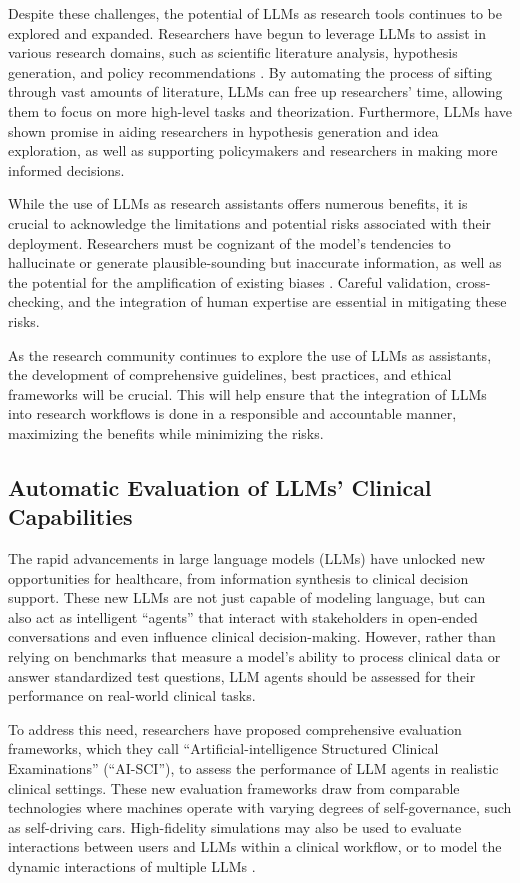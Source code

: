 \documentclass[11pt]{article}
\begin{document}
Despite these challenges, the potential of LLMs as research tools continues to be explored and expanded. Researchers have begun to leverage LLMs to assist in various research domains, such as scientific literature analysis, hypothesis generation, and policy recommendations \cite{ref321}. By automating the process of sifting through vast amounts of literature, LLMs can free up researchers' time, allowing them to focus on more high-level tasks and theorization. Furthermore, LLMs have shown promise in aiding researchers in hypothesis generation and idea exploration, as well as supporting policymakers and researchers in making more informed decisions.

While the use of LLMs as research assistants offers numerous benefits, it is crucial to acknowledge the limitations and potential risks associated with their deployment. Researchers must be cognizant of the model's tendencies to hallucinate or generate plausible-sounding but inaccurate information, as well as the potential for the amplification of existing biases \cite{ref6}. Careful validation, cross-checking, and the integration of human expertise are essential in mitigating these risks.

As the research community continues to explore the use of LLMs as assistants, the development of comprehensive guidelines, best practices, and ethical frameworks will be crucial. This will help ensure that the integration of LLMs into research workflows is done in a responsible and accountable manner, maximizing the benefits while minimizing the risks.

\subsection{Automatic Evaluation of LLMs' Clinical Capabilities}

The rapid advancements in large language models (LLMs) have unlocked new opportunities for healthcare, from information synthesis to clinical decision support. These new LLMs are not just capable of modeling language, but can also act as intelligent ``agents'' that interact with stakeholders in open-ended conversations and even influence clinical decision-making. However, rather than relying on benchmarks that measure a model's ability to process clinical data or answer standardized test questions, LLM agents should be assessed for their performance on real-world clinical tasks.

To address this need, researchers have proposed comprehensive evaluation frameworks, which they call ``Artificial-intelligence Structured Clinical Examinations'' (``AI-SCI''), to assess the performance of LLM agents in realistic clinical settings. These new evaluation frameworks draw from comparable technologies where machines operate with varying degrees of self-governance, such as self-driving cars. High-fidelity simulations may also be used to evaluate interactions between users and LLMs within a clinical workflow, or to model the dynamic interactions of multiple LLMs \cite{ref212}.
\end{document}
